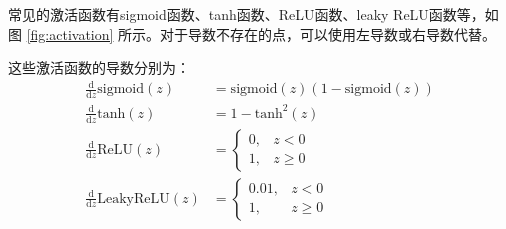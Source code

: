 常见的激活函数有sigmoid函数、tanh函数、ReLU函数、leaky ReLU函数等，如图 \ref{fig:activation} 所示。对于导数不存在的点，可以使用左导数或右导数代替。

\begin{figure*}[h!bt]
	\centering

	\centering
	\caption{Activation Functions 激活函数}
	\label{fig:activation}
\end{figure*}

这些激活函数的导数分别为：
\begin{equation}
	\begin{aligned}
		\frac{\mathrm{d}}{\mathrm{d}z}\mathrm{sigmoid}(z) &= \mathrm{sigmoid}(z)\left(1-\mathrm{sigmoid}(z)\right) \\
		\frac{\mathrm{d}}{\mathrm{d}z}\mathrm{tanh}(z) &= 1 - \mathrm{tanh}^2(z) \\
		\frac{\mathrm{d}}{\mathrm{d}z}\mathrm{ReLU}(z) &= 
			\begin{cases}
				0, &z < 0 \\
				1, &z \geqslant 0
			\end{cases}\\
		\frac{\mathrm{d}}{\mathrm{d}z}\mathrm{LeakyReLU}(z) &= 
			\begin{cases}
				0.01, &z < 0 \\
				1, &z \geqslant 0
			\end{cases}
	\end{aligned}
\end{equation}


